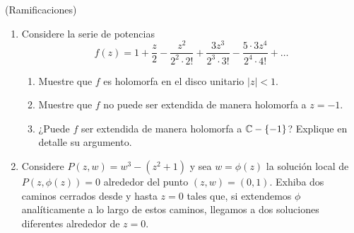 \begin{exercise}
(Ramificaciones)
\begin{enumerate}[label=\alph*)]
    \item Considere la serie de potencias
    $$f(z) = 1 + \frac z2 - \frac {z^2} {2^2 \cdot 2!} + \frac {3z^3} {2^3 \cdot 3!} - \frac {5 \cdot 3 z^4} {2^4 \cdot 4!} + \dots$$
    
    \begin{enumerate}[label=\arabic*)]
        \item Muestre que $f$ es holomorfa en el disco unitario $|z| < 1$.
        \item Muestre que $f$ no puede ser extendida de manera holomorfa a $z = -1$.
        \item ¿Puede $f$ ser extendida de manera holomorfa a $\mathbb C - \{ -1 \}$? Explique en detalle su argumento.
    \end{enumerate}
    
    \item Considere $P(z, w) = w^3 - (z^2 + 1)$ y sea $w = \phi(z)$ la solución local de $P(z, \phi(z)) = 0$ alrededor del punto $(z, w) = (0, 1)$. Exhiba dos caminos cerrados desde y hasta $z = 0$ tales que, si extendemos $\phi$ analíticamente a lo largo de estos caminos, llegamos a dos soluciones diferentes alrededor de $z = 0$.
\end{enumerate}
\end{exercise}

